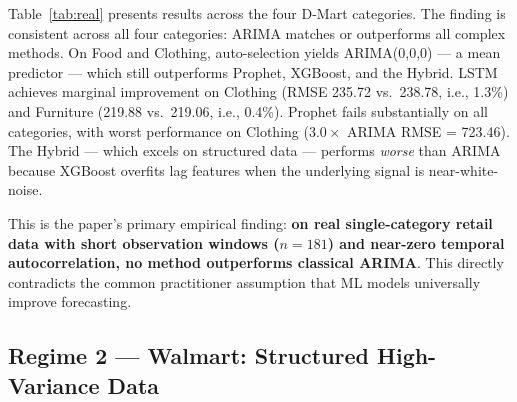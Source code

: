 \documentclass[journal]{IEEEtran}
\begin{document}
Table~\ref{tab:real} presents results across the four D-Mart categories. The finding is consistent across all four categories: ARIMA matches or outperforms all complex methods. On Food and Clothing, auto-selection yields ARIMA(0,0,0) — a mean predictor — which still outperforms Prophet, XGBoost, and the Hybrid. LSTM achieves marginal improvement on Clothing (RMSE 235.72 vs.\ 238.78, i.e., 1.3\%) and Furniture (219.88 vs.\ 219.06, i.e., 0.4\%). Prophet fails substantially on all categories, with worst performance on Clothing ($3.0\times$ ARIMA RMSE = 723.46). The Hybrid — which excels on structured data — performs \emph{worse} than ARIMA because XGBoost overfits lag features when the underlying signal is near-white-noise.

\begin{table}[htbp]
\centering
\caption{RMSE on Real D-Mart Data (4 Product Categories)}
\label{tab:real}
\end{table}

This is the paper's primary empirical finding: \textbf{on real single-category retail data with short observation windows ($n{=}181$) and near-zero temporal autocorrelation, no method outperforms classical ARIMA}. This directly contradicts the common practitioner assumption that ML models universally improve forecasting.

\subsection{Regime 2 — Walmart: Structured High-Variance Data}
\end{document}
